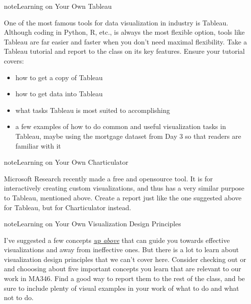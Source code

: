 \documentclass[letterpaper,10pt,english]{jupyterBook}
\begin{document}
\begin{sphinxadmonition}{note}{Learning on Your Own \sphinxhyphen{} Tableau}

\sphinxAtStartPar
One of the most famous tools for data visualization in industry is Tableau.  Although coding in Python, R, etc., is always the most flexible option, tools like Tableau are far easier and faster when you don’t need maximal flexibility.  Take a Tableau tutorial and report to the class on its key features.  Ensure your tutorial covers:
\begin{itemize}
\item {} 
\sphinxAtStartPar
how to get a copy of Tableau

\item {} 
\sphinxAtStartPar
how to get data into Tableau

\item {} 
\sphinxAtStartPar
what tasks Tableau is most suited to accomplishing

\item {} 
\sphinxAtStartPar
a few examples of how to do common and useful visualization tasks in Tableau, maybe using the mortgage dataset from Day 3 so that readers are familiar with it

\end{itemize}
\end{sphinxadmonition}

\begin{sphinxadmonition}{note}{Learning on Your Own \sphinxhyphen{} Charticulator}

\sphinxAtStartPar
Microsoft Research recently made  a free and open\sphinxhyphen{}source tool.  It is for interactively creating custom visualizations, and thus has a very similar purpose to Tableau, mentioned above.  Create a report just like the one suggested above for Tableau, but for Charticulator instead.
\end{sphinxadmonition}

\begin{sphinxadmonition}{note}{Learning on Your Own \sphinxhyphen{} Visualization Design Principles}

\sphinxAtStartPar
I’ve suggested a few concepts {\hyperref[\detokenize{chapter-10-visualization:techniques-not-to-use-and-why}]{\emph{up above}}} that can guide you towards effective visualizations and away from ineffective ones.  But there is a lot to learn about visualization design principles that we can’t cover here.  Consider checking out  or  and chooosing about five important concepts you learn that are relevant to our work in MA346.  Find a good way to report them to the rest of the class, and be sure to include plenty of visual examples in your work of what to do and what not to do.
\end{sphinxadmonition}
\end{document}
